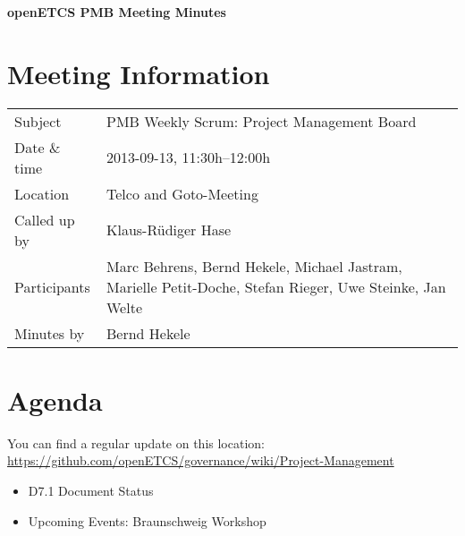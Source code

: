\documentclass[a4paper, 11pt]{article}
\begin{document}
{\begin{center}\huge\bf openETCS PMB Meeting Minutes\end{center}}
\section{Meeting Information}

\renewcommand{\arraystretch}{1.5}
\begin{supertabular}{m{.2\textwidth}m{.8\textwidth}}
Subject & PMB Weekly Scrum: Project Management Board\\
Date \& time & 2013-09-13, 11:30h--12:00h\\
Location & Telco and Goto-Meeting\\
Called up by & Klaus-R\"udiger Hase\\
Participants &
Marc Behrens,
Bernd Hekele,
Michael Jastram,
Marielle Petit-Doche,
Stefan Rieger,
Uwe Steinke,
Jan Welte
\\

Minutes by & Bernd Hekele\\

\end{supertabular}
\renewcommand{\arraystretch}{1.0}


\section{{Agenda}}
You can find a regular update on this location: \url{https://github.com/openETCS/governance/wiki/Project-Management}

\begin{itemize}
\item D7.1 Document Status
\item Upcoming Events: Braunschweig Workshop
\end{itemize}
\end{document}
